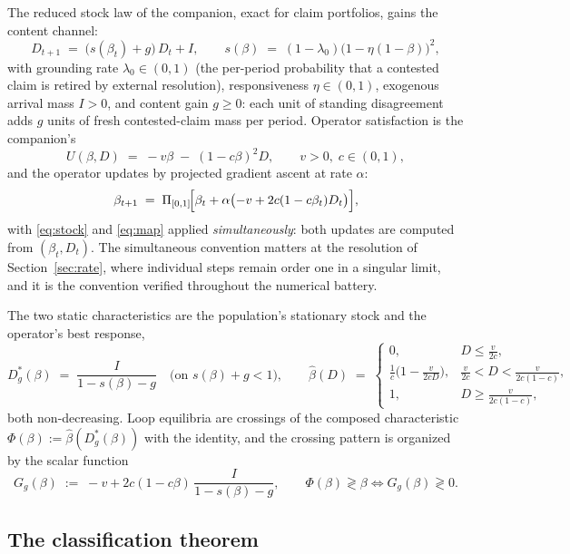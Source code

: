 \documentclass[11pt]{article}
\theoremstyle{definition}
\theoremstyle{remark}
\numberwithin{equation}{section}
\begin{document}
The reduced stock law of the companion, exact for claim portfolios, gains the content channel:
\begin{equation}\label{eq:stock}
D_{t+1} \;=\; \bigl(s(\beta_t) + g\bigr)\,D_t + I,
\qquad
s(\beta) \;=\; (1-\lambda_0)\bigl(1-\eta(1-\beta)\bigr)^{2},
\end{equation}
with grounding rate $\lambda_0\in(0,1)$ (the per-period probability that a contested claim is retired by external resolution), responsiveness $\eta\in(0,1)$, exogenous arrival mass $I>0$, and content gain $g\ge 0$: each unit of standing disagreement adds $g$ units of fresh contested-claim mass per period. Operator satisfaction is the companion's
\[
U(\beta, D) \;=\; -v\beta \;-\; (1-c\beta)^2 D,
\qquad v>0,\; c\in(0,1),
\]
and the operator updates by projected gradient ascent at rate $\alpha$:
\begin{equation}\label{eq:map}
\beta_{t+1} \;=\; \Pi_{[0,1]}\!\Bigl[\beta_t + \alpha\bigl(-v + 2c(1-c\beta_t)D_t\bigr)\Bigr],
\end{equation}
with \eqref{eq:stock} and \eqref{eq:map} applied \emph{simultaneously}: both updates are computed from $(\beta_t, D_t)$. The simultaneous convention matters at the resolution of Section~\ref{sec:rate}, where individual steps remain order one in a singular limit, and it is the convention verified throughout the numerical battery.

The two static characteristics are the population's stationary stock and the operator's best response,
\[
D^\ast_g(\beta) \;=\; \frac{I}{1 - s(\beta) - g}
\quad \text{(on } s(\beta)+g<1\text{)},
\qquad
\hat\beta(D) \;=\;
\begin{cases}
0, & D \le \tfrac{v}{2c},\\[2pt]
\tfrac{1}{c}\bigl(1 - \tfrac{v}{2cD}\bigr), & \tfrac{v}{2c} < D < \tfrac{v}{2c(1-c)},\\[2pt]
1, & D \ge \tfrac{v}{2c(1-c)},
\end{cases}
\]
both non-decreasing. Loop equilibria are crossings of the composed characteristic $\Phi(\beta):=\hat\beta(D^\ast_g(\beta))$ with the identity, and the crossing pattern is organized by the scalar function
\begin{equation}\label{eq:Gg}
G_g(\beta) \;:=\; -v + 2c(1-c\beta)\,\frac{I}{1 - s(\beta) - g},
\qquad
\Phi(\beta) \gtrless \beta \iff G_g(\beta) \gtrless 0 .
\end{equation}

\subsection{The classification theorem}
\end{document}
